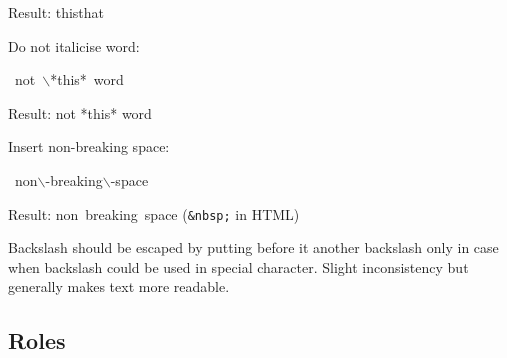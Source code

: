 \documentclass[12pt]{article}
\begin{document}
Result: thisthat

Do not italicise word:

\begin{ttfamily}\begin{flushleft}
\mbox{~not~$\backslash$*this*~word}\\
\end{flushleft}\end{ttfamily}

Result: not *this* word

Insert non-breaking space:

\begin{ttfamily}\begin{flushleft}
\mbox{~non$\backslash$-breaking$\backslash$-space}\\
\end{flushleft}\end{ttfamily}

Result: non~breaking~space (\texttt{\&nbsp;} in HTML)

\begin{center}
\end{center}

Backslash should be escaped by putting before it another backslash only in
case when backslash could be used in special character. Slight inconsistency
but generally makes text more readable.

\hypertarget{lroles}{}
\subsection{Roles}
\end{document}
